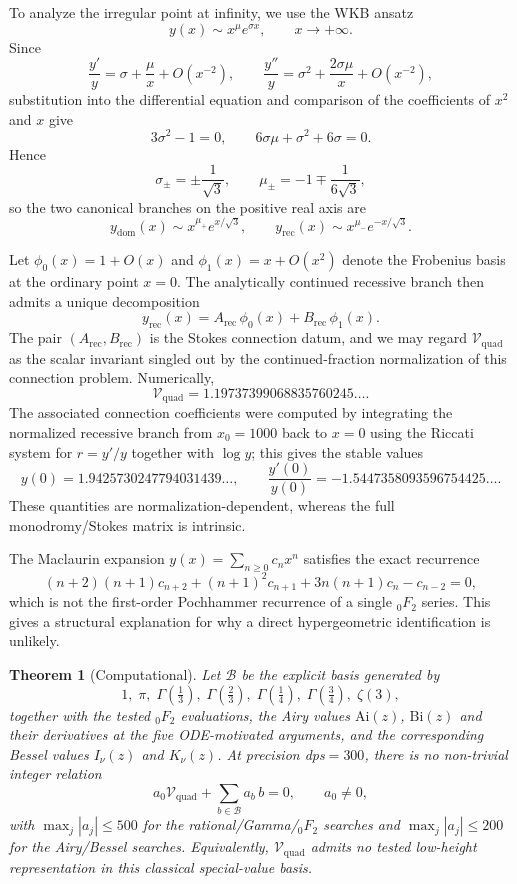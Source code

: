 \documentclass[11pt,a4paper]{article}
\newtheorem{theorem}{Theorem}
\begin{document}
To analyze the irregular point at infinity, we use the WKB ansatz
\[
  y(x)\sim x^{\mu}e^{\sigma x}, \qquad x\to +\infty.
\]
Since
\[
  \frac{y'}{y}=\sigma+\frac{\mu}{x}+O(x^{-2}),
  \qquad
  \frac{y''}{y}=\sigma^2+\frac{2\sigma\mu}{x}+O(x^{-2}),
\]
substitution into the differential equation and comparison of the
coefficients of $x^2$ and $x$ give
\[
  3\sigma^2-1=0,
  \qquad
  6\sigma\mu+\sigma^2+6\sigma=0.
\]
Hence
\[
  \sigma_{\pm}=\pm \frac{1}{\sqrt{3}},
  \qquad
  \mu_{\pm}=-1 \mp \frac{1}{6\sqrt{3}},
\]
so the two canonical branches on the positive real axis are
\[
  y_{\mathrm{dom}}(x)\sim x^{\mu_+}e^{x/\sqrt{3}},
  \qquad
  y_{\mathrm{rec}}(x)\sim x^{\mu_-}e^{-x/\sqrt{3}}.
\]

Let $\phi_0(x)=1+O(x)$ and $\phi_1(x)=x+O(x^2)$ denote the Frobenius basis
at the ordinary point $x=0$. The analytically continued recessive branch
then admits a unique decomposition
\[
  y_{\mathrm{rec}}(x)=A_{\mathrm{rec}}\,\phi_0(x)+B_{\mathrm{rec}}\,\phi_1(x).
\]
The pair $(A_{\mathrm{rec}},B_{\mathrm{rec}})$ is the Stokes connection datum,
and we may regard $\mathcal{V}_{\mathrm{quad}}$ as the scalar invariant singled
out by the continued-fraction normalization of this connection problem.
Numerically,
\[
  \mathcal{V}_{\mathrm{quad}} = 1.19737399068835760245\ldots.
\]
The associated connection coefficients were computed by integrating the
normalized recessive branch from $x_0=1000$ back to $x=0$ using the
Riccati system for $r=y'/y$ together with $\log y$; this gives the stable
values
\[
  y(0)=1.9425730247794031439\ldots,
  \qquad
  \frac{y'(0)}{y(0)}=-1.5447358093596754425\ldots.
\]
These quantities are normalization-dependent, whereas the full
monodromy/Stokes matrix is intrinsic.

The Maclaurin expansion $y(x)=\sum_{n\ge 0} c_n x^n$ satisfies the exact
recurrence
\[
  (n+2)(n+1)c_{n+2} + (n+1)^2 c_{n+1} + 3n(n+1)c_n - c_{n-2}=0,
\]
which is not the first-order Pochhammer recurrence of a single
${}_0F_2$ series. This gives a structural explanation for why a direct
hypergeometric identification is unlikely.

\begin{theorem}[Computational]\label{thm:vquad-computational-exclusion}
Let $\mathcal{B}$ be the explicit basis generated by
\[
  1,\; \pi,\; \Gamma\!\left(\tfrac13\right),\; \Gamma\!\left(\tfrac23\right),\;
  \Gamma\!\left(\tfrac14\right),\; \Gamma\!\left(\tfrac34\right),\; \zeta(3),
\]
together with the tested ${}_0F_2$ evaluations, the Airy values
$\mathrm{Ai}(z)$, $\mathrm{Bi}(z)$ and their derivatives at the five
ODE-motivated arguments, and the corresponding Bessel values
$I_{\nu}(z)$ and $K_{\nu}(z)$. At precision dps$=300$, there is no
non-trivial integer relation
\[
  a_0\mathcal{V}_{\mathrm{quad}} + \sum_{b\in\mathcal{B}} a_b\,b = 0,
  \qquad a_0\neq 0,
\]
with $\max_j |a_j|\le 500$ for the rational/Gamma/${}_0F_2$ searches and
$\max_j |a_j|\le 200$ for the Airy/Bessel searches. Equivalently,
$\mathcal{V}_{\mathrm{quad}}$ admits no tested low-height representation in
this classical special-value basis.
\end{theorem}
\end{document}

